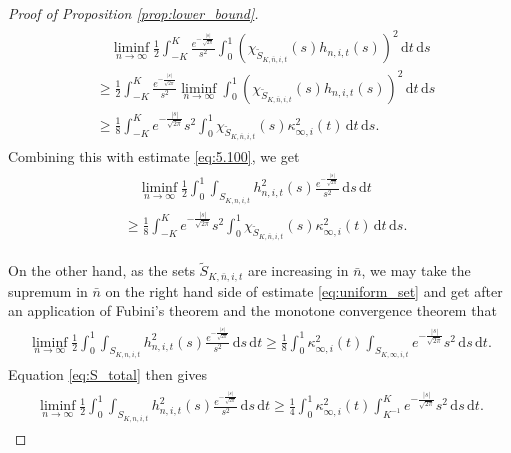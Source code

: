 \documentclass[11pt]{article}
\numberwithin{statement}{section}
\numberwithin{equation}{section}
\theoremstyle{remark}
\newcommand{\intd}{\, \mathrm{d}} 				%
\begin{document}
\begin{proof}[Proof of Proposition \ref{prop:lower_bound}]
\begin{align}
	  \begin{split}
            & \quad \liminf_{n \to \infty} \frac{1}{2} \int_{-K}^K
            \frac{e^{- \frac{|s|}{\sqrt{2\pi}}}}{s^2} \int_0^1 \left(
              \chi_{\tilde S_{K,\bar n, i,t}} (s)
              h_{n,i,t}(s)\right)^2\intd t \intd s \\
            & \geq \frac{1}{2} \int_{-K}^K \frac{e^{-
                \frac{|s|}{\sqrt{2\pi}}}}{s^2} \liminf_{n \to \infty}
            \int_0^1 \left( \chi_{\tilde S_{K,\bar n, i,t}} (s)
              h_{n,i,t}(s)\right)^2\intd t \intd s\\
            & \geq \frac{1}{8} \int_{-K}^K e^{-
              \frac{|s|}{\sqrt{2\pi}}} s^2 \int_0^1 \chi_{\tilde
              S_{K,\bar n, i,t}} (s) \kappa_{\infty,i}^2(t) \intd t
            \intd s.
            \end{split}
	\end{align}
	Combining this with estimate \eqref{eq:5.100}, we get
	\begin{align}\label{eq:uniform_set}
	  \begin{split}
	  	& \quad \liminf_{n \to \infty} \frac{1}{2} \int_0^1 \int_{
              S_{K,n,i,t}}
            h^2_{n,i,t}(s)  \frac{e^{- \frac{|s|}{\sqrt{2\pi}} }}{s^2} \intd s \intd t \\
             & \geq  \frac{1}{8} \int_{-K}^K e^{-
              \frac{|s|}{\sqrt{2\pi}}} s^2 \int_0^1 \chi_{\tilde
              S_{K,\bar n, i,t}} (s) \kappa_{\infty,i}^2(t) \intd t
            \intd s.
          \end{split}
	\end{align}
	
	On the other hand, as the sets $\tilde S_{K,\bar n, i,t} $ are
        increasing in $\bar n$, we may take the supremum in $\bar n$
        on the right hand side of estimate \eqref{eq:uniform_set} and
        get after an application of Fubini's theorem and the monotone
        convergence theorem that 
	\begin{align}
	  \begin{split}
            \liminf_{n \to \infty} \frac{1}{2} \int_0^1 \int_{
              S_{K,n,i,t}} h^2_{n,i,t}(s) \frac{e^{-
                \frac{|s|}{\sqrt{2\pi}} }}{s^2} \intd s \intd t \geq
            \frac{1}{8}\int_0^1 \kappa_{\infty,i}^2(t)
            \int_{S_{K,\infty,i,t}} e^{- \frac{|s|}{\sqrt{2\pi}}} s^2
            \intd s \intd t.
            \end{split}
	\end{align}
	Equation \eqref{eq:S_total} then gives
	\begin{align}\label{eq:insert_S}
	  \begin{split}
            \liminf_{n \to \infty} \frac{1}{2} \int_0^1 \int_{
              S_{K,n,i,t}} h^2_{n,i,t}(s) \frac{e^{-
                \frac{|s|}{\sqrt{2\pi}} }}{s^2} \intd s \intd t \geq
            \frac{1}{4}\int_0^1 \kappa_{\infty,i}^2(t) \int_{K^{-1}}^K
            e^{- \frac{|s|}{\sqrt{2\pi}}} s^2 \intd s \intd t.
            \end{split}
	\end{align}
	

\end{proof}
\end{document}
